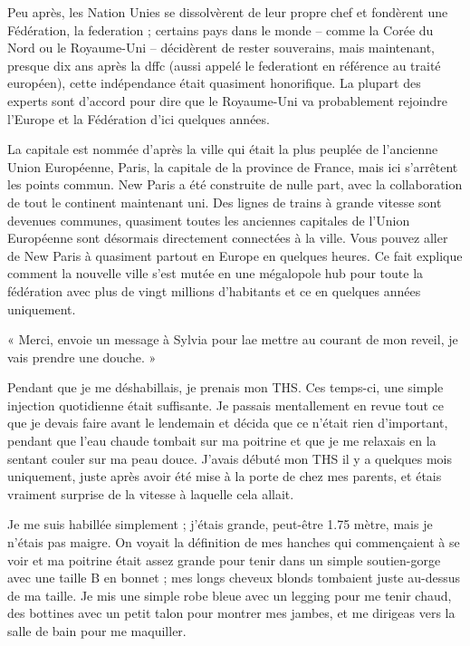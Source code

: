 \documentclass[12pt,hidelinks,a4paper]{book}
\begin{document}
\bigskip

Peu après, les Nation Unies se dissolvèrent de leur propre chef et
fondèrent une Fédération, la \gls{federation} ; certains pays dans
le monde -- comme la Corée du Nord ou le Royaume-Uni -- décidèrent
de rester souverains, mais maintenant, presque dix ans après la \gls{dffc}
(aussi appelé le \gls{federationt} en référence au traité européen),
cette indépendance était quasiment honorifique. La plupart des experts
sont d'accord pour dire que le Royaume-Uni va probablement rejoindre
l'Europe et la Fédération d'ici quelques années.\par

\bigskip

La capitale est nommée d'après la ville qui était la plus peuplée
de l'ancienne Union Européenne, Paris, la capitale de la province
de France, mais ici s'arrêtent les points commun. New Paris a été
construite de nulle part, avec la collaboration de tout le continent
maintenant uni. Des lignes de trains à grande vitesse sont devenues
communes, quasiment toutes les anciennes capitales de l'Union Européenne
sont désormais directement connectées à la ville. Vous pouvez aller
de New Paris à quasiment partout en Europe en quelques heures. Ce
fait explique comment la nouvelle ville s'est mutée en une mégalopole
hub pour toute la fédération avec plus de vingt millions d'habitants
et ce en quelques années uniquement.\par

\bigskip

« Merci, envoie un message à Sylvia pour lae mettre au courant de
mon reveil, je vais prendre une douche. »\par

\bigskip
Pendant que je me déshabillais, je prenais mon THS. Ces temps-ci,
une simple injection quotidienne était suffisante. Je passais mentallement
en revue tout ce que je devais faire avant le lendemain et décida
que ce n'était rien d'important, pendant que l'eau chaude tombait
sur ma poitrine et que je me relaxais en la sentant couler sur ma
peau douce. J'avais débuté mon THS il y a quelques mois uniquement,
juste après avoir été mise à la porte de chez mes parents, et étais
vraiment surprise de la vitesse à laquelle cela allait.\par 

\bigskip

Je me suis habillée simplement ; j'étais grande, peut-être 1.75 mètre,
mais je n'étais pas maigre. On voyait la définition de mes hanches
qui commençaient à se voir et ma poitrine était assez grande pour
tenir dans un simple soutien-gorge avec une taille B en bonnet ; mes
longs cheveux blonds tombaient juste au-dessus de ma taille. Je mis
une simple robe bleue avec un legging pour me tenir chaud, des bottines
avec un petit talon pour montrer mes jambes, et me dirigeas vers la
salle de bain pour me maquiller.\par
\end{document}
